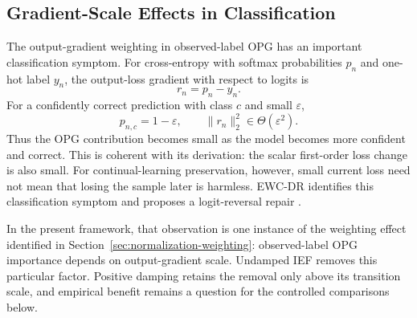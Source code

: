 \subsection{Gradient-Scale Effects in Classification}

The output-gradient weighting in observed-label OPG has an important classification symptom. For cross-entropy with softmax probabilities $p_n$ and one-hot label $y_n$, the output-loss gradient with respect to logits is
\[
r_n=p_n-y_n.
\]
For a confidently correct prediction with class $c$ and small $\varepsilon$,
\[
p_{n,c}=1-\varepsilon,
\qquad
\|r_n\|_2^2\in\Theta(\varepsilon^2).
\]
Thus the OPG contribution becomes small as the model becomes more confident and correct. This is coherent with its derivation: the scalar first-order loss change is also small. For continual-learning preservation, however, small current loss need not mean that losing the sample later is harmless. EWC-DR identifies this classification symptom and proposes a logit-reversal repair \citep{EWC-DR}.

In the present framework, that observation is one instance of the weighting effect identified in Section~\ref{sec:normalization-weighting}: observed-label OPG importance depends on output-gradient scale. Undamped IEF removes this particular factor. Positive damping retains the removal only above its transition scale, and empirical benefit remains a question for the controlled comparisons below.

